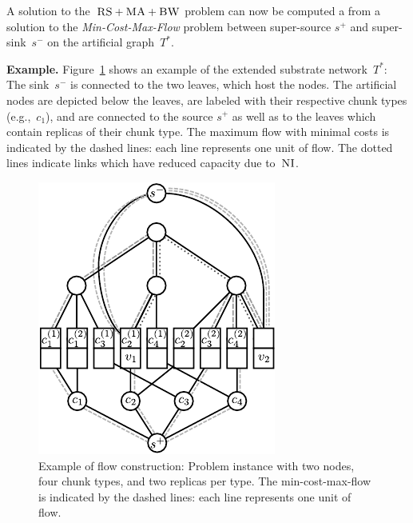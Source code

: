 \documentclass[preprint,12pt]{elsarticle}
\newcommand{\Source}{\ensuremath{s^{+}}}
\newcommand{\Sink}{\ensuremath{s^{-}}}
\newcommand{\achunk}{\ensuremath{c}}
\newcommand{\CC}{\textsc{NI}}
\newcommand{\FP}{\textsc{FP}}
\newcommand{\RS}{\textsc{RS}}
\newcommand{\BW}{\textsc{BW}}
\newcommand{\MA}{\textsc{MA}}
\newcommand{\Tree}{\ensuremath{T}}
\begin{document}
A solution to the~$\RS+\MA+\BW$ problem can now be computed
a from a solution to the \emph{Min-Cost-Max-Flow} problem between super-source
$\Source$ and
super-sink~$\Sink$ on the artificial graph~$\Tree^*$.

\textbf{Example.} Figure~\ref{fig:flow_construction} shows an example of the extended substrate
network~$\Tree^*$: The sink~$\Sink$ is connected to the two leaves, which host the
nodes. The artificial nodes are depicted below the leaves, are labeled with
their respective chunk types (e.g.,~$\achunk_1$), and are connected to the source
$\Source$ as well as to the leaves which contain replicas of their chunk type.
The
maximum flow with minimal costs is indicated by the dashed lines: each line
represents one unit of flow. The dotted lines indicate links which have reduced
capacity due to~$\CC$.

\begin{figure}
\centering
\includegraphics[width=0.45\columnwidth]{figs/flow_ma_cv}
\caption{Example of flow construction: Problem instance with two nodes, four chunk
types, and two replicas per type. The min-cost-max-flow
is indicated by the dashed lines: each line represents one unit of flow.
}
\vspace{-1em}
\label{fig:flow_construction}
\end{figure}
\end{document}
